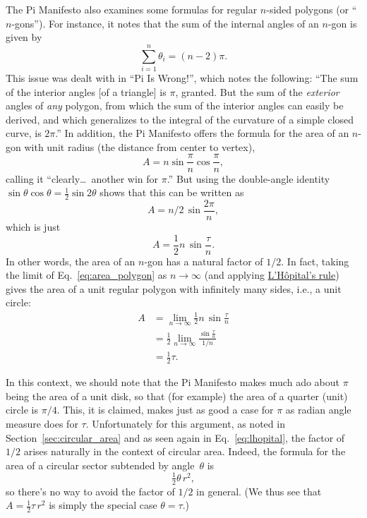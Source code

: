 {The Pi Manifesto also examines some formulas for regular
$n$-sided polygons (or ``$n$-gons''). For instance, it notes that the sum of the internal angles of an $n$-gon is given by
\[
\sum_{i=1}^n \theta_i=(n-2)\pi.
\]
This issue was dealt with in ``Pi Is Wrong!'', which notes the following: ``The sum of the interior angles [of a
triangle] is $\pi$, granted. But the sum of the \emph{exterior} angles of \emph{any}
polygon, from which the sum of the interior angles can easily be
derived, and which generalizes to the integral of the curvature of a
simple closed curve, is $2\pi$.'' In addition, the Pi Manifesto offers the formula for the area of an $n$-gon with unit radius (the distance from center to vertex),
\[ A=n\sin\frac{\pi}{n}\cos\frac{\pi}{n}, \]
calling it ``clearly\ldots\ another win for $\pi$.'' But using the double-angle identity $\sin\theta\cos\theta = \frac{1}{2} \sin 2\theta$ shows that this can be written as
\[ A = n/2\, \sin\frac{2\pi}{n}, \]
which is just
\begin{equation}
\label{eq:area_polygon}
A = \frac{1}{2} n\, \sin\frac{\tau}{n}.
\end{equation}
In other words, the area of an $n$-gon has a natural
factor of $1/2$. In fact, taking the limit of Eq.~\eqref{eq:area_polygon} as $n\rightarrow \infty$ (and applying \href{https://mathworld.wolfram.com/LHospitalsRule.html}{L'H\^{o}pital's rule}) gives the area of a unit regular polygon with infinitely many sides, i.e., a unit circle:
\begin{equation}
\label{eq:lhopital}
\begin{split}
A & = \lim_{n\rightarrow\infty} \frac{1}{2} n\, \sin\frac{\tau}{n} \\
  & = \frac{1}{2} \lim_{n\rightarrow\infty} \frac{\sin\frac{\tau}{n}}{1/n} \\
  & = \tfrac{1}{2}\tau.
\end{split}
\end{equation}

In this context, we should note that the Pi Manifesto makes much ado about $\pi$ being the area of a unit disk, so that (for example) the area of a quarter (unit) circle is $\pi/4$. This, it is claimed, makes just as good a case for $\pi$ as radian angle measure does for $\tau$. Unfortunately for this argument, as noted in Section~\ref{sec:circular_area} and as seen again in Eq.~\eqref{eq:lhopital}, the factor of $1/2$ arises naturally in the context of circular area. Indeed, the formula for the area of a circular sector subtended by angle~$\theta$ is
\[
\tfrac{1}{2}\theta\, r^2,
\]
so there's no way to avoid the factor of $1/2$ in general. (We thus see that $A =
\frac{1}{2} \tau\, r^2$ is simply the special case $\theta = \tau$.)

}
